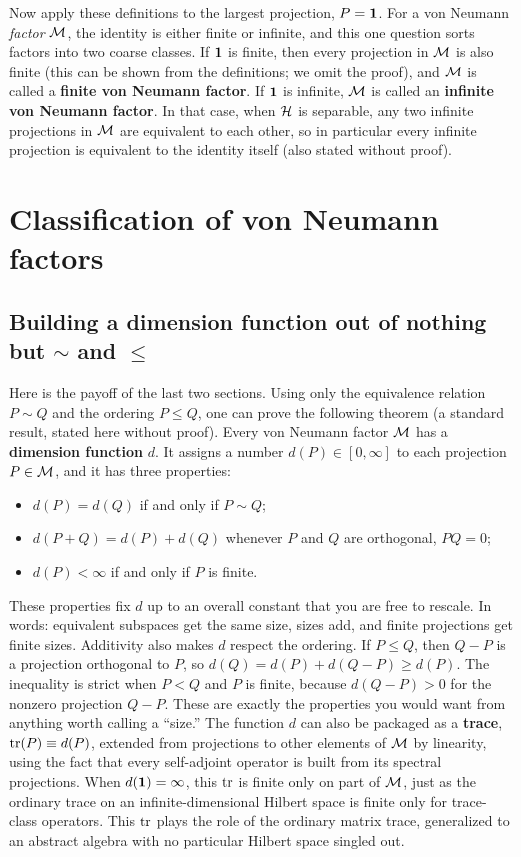 Now apply these definitions to the largest projection, $P=\mathbf{1}$. For a von Neumann \emph{factor} $\mathcal{M}$, the
identity is either finite or infinite, and this one question sorts factors into two coarse classes. If $\mathbf{1}$
is finite, then every projection in $\mathcal{M}$ is also finite (this can be shown from the definitions; we omit the
proof), and $\mathcal{M}$ is called a \textbf{finite von Neumann factor}. If $\mathbf{1}$ is infinite, $\mathcal{M}$ is called an
\textbf{infinite von Neumann factor}. In that case, when $\mathcal{H}$ is separable, any two infinite projections in
$\mathcal{M}$ are equivalent to each other, so in particular every infinite projection is equivalent to the identity
itself (also stated without proof).

\section{Classification of von Neumann factors}

\subsection*{Building a dimension function out of nothing but $\sim$ and $\le$}

Here is the payoff of the last two sections. Using only the equivalence relation $P\sim Q$ and the ordering
$P\le Q$, one can prove the following theorem (a standard result, stated here without proof). Every von
Neumann factor $\mathcal{M}$ has a \textbf{dimension function} $d$. It assigns a number $d(P)\in[0,\infty]$ to each
projection $P\in\mathcal{M}$, and it has three properties:
\begin{itemize}
\item $d(P)=d(Q)$ if and only if $P\sim Q$;
\item $d(P+Q)=d(P)+d(Q)$ whenever $P$ and $Q$ are orthogonal, $PQ=0$;
\item $d(P)<\infty$ if and only if $P$ is finite.
\end{itemize}
These properties fix $d$ up to an overall constant that you are free to rescale. In words: equivalent
subspaces get the same size, sizes add, and finite projections get finite sizes. Additivity also makes $d$
respect the ordering. If $P\le Q$, then $Q-P$ is a projection orthogonal to $P$, so
$d(Q)=d(P)+d(Q-P)\ge d(P)$. The inequality is strict when $P<Q$ and $P$ is finite, because $d(Q-P)>0$ for the
nonzero projection $Q-P$. These are exactly the properties you would want from anything worth calling a
``size.'' The function $d$ can also be packaged as a \textbf{trace}, $\operatorname{tr}(P)\equiv d(P)$, extended from
projections to other elements of $\mathcal{M}$ by linearity, using the fact that every self-adjoint operator is built
from its spectral projections. When $d(\mathbf{1})=\infty$, this $\operatorname{tr}$ is finite only on part of $\mathcal{M}$, just as the
ordinary trace on an infinite-dimensional Hilbert space is finite only for trace-class operators. This $\operatorname{tr}$
plays the role of the ordinary matrix trace, generalized to an abstract algebra with no particular Hilbert
space singled out.

